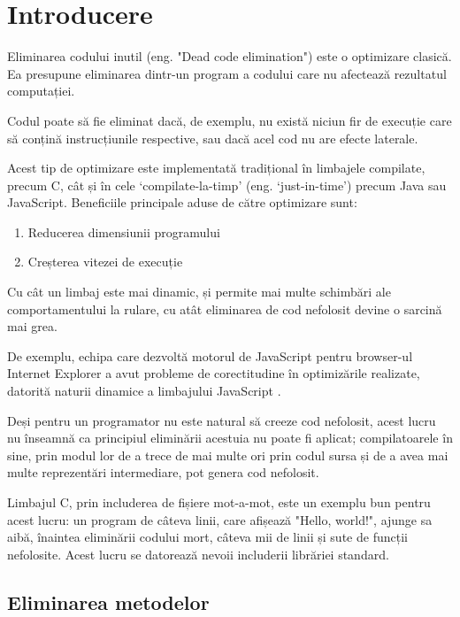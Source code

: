 \chapter{Introducere}

Eliminarea codului inutil (eng. "Dead code elimination")
\cite{wiki:deadcodeelimination} este o optimizare clasică.  Ea
presupune eliminarea dintr-un program a codului care nu afectează
rezultatul computației.

Codul poate să fie eliminat dacă, de exemplu, nu există niciun fir
de execuție care să conțină instrucțiunile respective, sau dacă
acel cod nu are efecte laterale.

Acest tip de optimizare este implementată tradițional în
limbajele compilate, precum C, cât și în cele `compilate-la-timp'
(eng. `just-in-time') precum Java sau JavaScript.  Beneficiile
principale aduse de către optimizare sunt:

\begin{enumerate}
	\item Reducerea dimensiunii programului
	\item Creșterea vitezei de execuție
\end{enumerate}

Cu cât un limbaj este mai dinamic, și permite mai multe schimbări ale
comportamentului la rulare, cu atât eliminarea de cod nefolosit
devine o sarcină mai grea.

De exemplu, echipa care dezvoltă motorul de JavaScript pentru
browser-ul Internet Explorer a avut probleme de corectitudine în
optimizările realizate, datorită naturii dinamice a limbajului
JavaScript \cite{deadcodeeliminationforbeginners}.

Deși pentru un programator nu este natural să creeze cod
nefolosit, acest lucru nu înseamnă ca principiul eliminării
acestuia nu poate fi aplicat; compilatoarele în sine, prin modul
lor de a trece de mai multe ori prin codul sursa și de a avea mai
multe reprezentări intermediare, pot genera cod nefolosit.

Limbajul C, prin includerea de fișiere mot-a-mot, este un exemplu
bun pentru acest lucru: un program de câteva linii, care afișează
"Hello, world!", ajunge sa aibă, înaintea eliminării codului mort,
câteva mii de linii și sute de funcții nefolosite. Acest lucru se datorează
nevoii includerii librăriei standard.

\section{Eliminarea metodelor}

